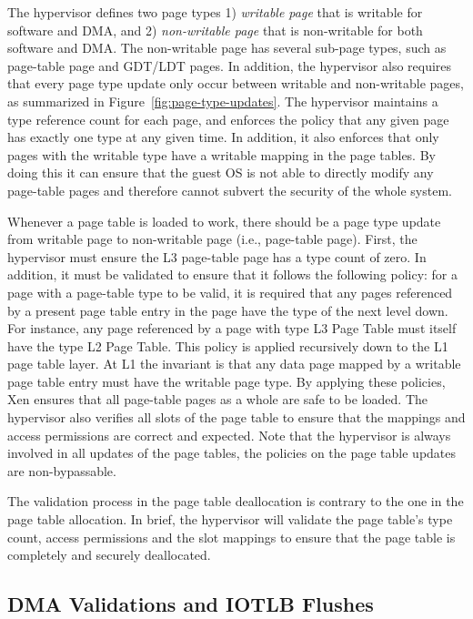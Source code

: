 The hypervisor defines two page types 1) \emph{writable page} that is writable for software and DMA, and 2) \emph{non-writable page} that is non-writable for both software and DMA.
The non-writable page has several sub-page types, such as page-table page and GDT/LDT pages.
In addition, the hypervisor also requires that every page type update only occur between writable and non-writable pages, as summarized in Figure~\ref{fig:page-type-updates}.
The hypervisor maintains a type reference count for each page, and enforces the policy that any given page has exactly one type at any given time.
In addition, it also enforces that only pages with the writable type have a writable mapping in the page tables.
By doing this it can ensure that the guest OS is not able to directly modify any page-table pages and therefore cannot subvert the security of the whole system.

Whenever a page table is loaded to work, there should be a page type update from writable page to non-writable page (i.e., page-table page).
First, the hypervisor must ensure the L3 page-table page has a type count of zero.
In addition, it must be validated to ensure that it follows the following policy:
for a page with a page-table type to be valid, it is required that any pages referenced
by a present page table entry in the page have the type of the next level down.
For instance, any page referenced by a page with type L3 Page Table must itself have the type L2 Page Table.
This policy is applied recursively down to the L1 page table layer.
At L1 the invariant is that any data page mapped by a writable page table entry must have the writable page type.
By applying these policies, Xen ensures that all page-table pages as a whole are safe to be loaded.
The hypervisor also verifies all slots of the page table to ensure that the mappings and access permissions are correct and expected.
Note that the hypervisor is always involved in all updates of the page tables, the policies on the page table updates are non-bypassable.

The validation process in the page table deallocation is contrary to the one in the page table allocation.
In brief, the hypervisor will validate the page table's type count, access permissions and the slot mappings to ensure that the page table is completely and securely deallocated.

\subsection{DMA Validations and IOTLB Flushes}
